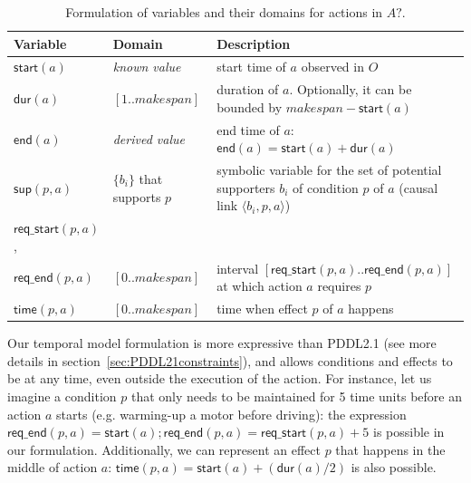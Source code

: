 \documentclass[runningheads]{llncs}
\newcommand{\tup}[1]{{\langle #1 \rangle}}
\newcommand{\dur}{\mathsf{dur}}    %
\newcommand{\start}{\mathsf{start}}%
\newcommand{\en}{\mathsf{end}}     %
\newcommand{\supp}{\mathsf{sup}}   %
\newcommand{\tim}{\mathsf{time}}   %
\newcommand{\reqs}{\mathsf{req\_{start}}} %
\newcommand{\reqe}{\mathsf{req\_{end}}}   %
\begin{document}
\begin{table}
\begin{center}
\small
\begin{tabular}{p{2cm}p{2.7cm}p{7.4cm}}
Variable & Domain & Description \\

\hline


$\start(a)$ & \emph{known value} & start time of $a$ observed in $O$ \\
$\dur(a)$ & $[1..makespan]$ & duration of $a$. Optionally, it can be bounded by $makespan-\start(a)$\\
$\en(a)$ & \emph{derived value} & end time of $a$: $\en(a)=\start(a)+\dur(a)$ \\


$\supp(p,a)$ & $\{b_i\}$ that \newline supports $p$ & symbolic variable for the set of potential supporters $b_i$ of condition $p$ of $a$ (causal link $\tup{b_i,p,a}$) \\

$\reqs(p,a)$, \\
$\reqe(p,a)$ & $[0..makespan]$ & interval $[\reqs(p,a)..\reqe(p,a)]$ at which action $a$ requires $p$ \\

$\tim(p,a)$ & $[0..makespan]$ & time when effect $p$ of $a$ happens \\


\hline
\end{tabular}
\normalsize
\end{center}
\caption{Formulation of variables and their domains for actions in $A?$.}
\label{table:variables}
\end{table}



Our temporal model formulation is more expressive than PDDL2.1 (see more details in section~\ref{sec:PDDL21constraints}), and allows conditions and effects to be at any time, even outside the execution of the action. For instance, let us imagine a condition $p$ that only needs to be maintained for 5 time units before an action $a$ starts (e.g. warming-up a motor before driving): the expression $\reqe(p,a)=\start(a); \reqe(p,a) = \reqs(p,a)+5$ is possible in our formulation. Additionally, we can represent an effect $p$ that happens in the middle of action $a$: $\tim(p,a) = \start(a)+ (\dur(a) / 2)$ is also possible.
\end{document}
